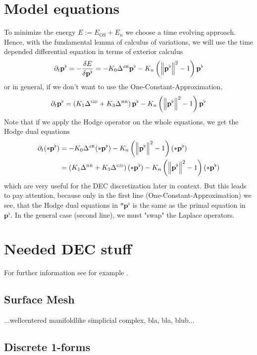\documentclass[a4paper,11pt]{scrartcl}
\newcommand{\pfl}{\mathbf{p}^{\flat}}
\newcommand{\EOS}{E_{\text{OS}}}
\newcommand{\EN}{E_{n}}
\newcommand{\LB}{\Delta^{\text{\tiny RR}}}
\newcommand{\LCB}{\Delta^{\text{\tiny GD}}}
\newcommand{\LDR}{\Delta^{\text{\tiny dR}}}
\begin{document}
\section{Model equations}
  To minimize the energy \( E := \EOS + \EN \) we choose a time evolving approach. 
  Hence, with the fundamental lemma of calculus of variations, we will use the time depended differential equation in terms of exterior
  calculus
  \begin{align} \label{eqPOC}
    \partial_{t}\pfl = -\frac{\delta E}{\delta\pfl}
                     = -K_{0}\LDR\pfl - K_{n} \left( \left\| \pfl \right\|^{2} - 1 \right)\pfl
  \end{align}
  or in general, if we don't want to use the One-Constant-Approximation,
  \begin{align} \label{eqP}
    \partial_{t}\pfl = \left( K_{1}\LCB + K_{3}\LB\right)\pfl - K_{n} \left( \left\| \pfl \right\|^{2} - 1 \right)\pfl
  \end{align}
  Note that if we apply the Hodge operator on the whole equations, we get the Hodge dual equations
  \begin{align}
    \label{eqDOC}
    \partial_{t}(*\pfl) &= -K_{0}\LDR (*\pfl) - K_{n} \left( \left\| \pfl \right\|^{2} - 1 \right)(*\pfl) \\
    \label{eqD}
                        &=  \left( K_{1}\LB + K_{3}\LCB\right) (*\pfl) - K_{n} \left( \left\| \pfl \right\|^{2} - 1 \right)(*\pfl)
  \end{align}
  which are very useful for the DEC discretization later in context.
  But this leads to pay attention, because only in the first line (One-Constant-Approximation) we see, 
  that the Hodge dual equations in \( *\pfl \) is the same as the primal equation in \( \pfl \). 
  In the general case (second line), we must "swap" the Laplace operators.



\section{Needed DEC stuff}
  
For further information see for example \cite{whitney,hirani}. 

  \subsection{Surface Mesh}
    ...wellcentered manifoldlike simplicial complex, bla, bla, blub...

  \subsection{Discrete 1-forms}
\end{document}
